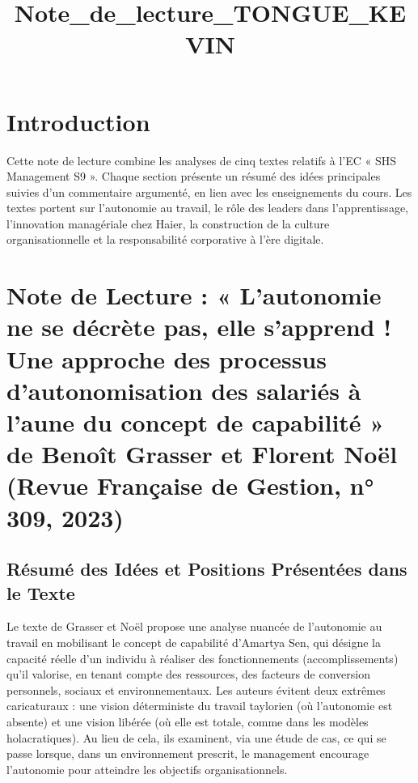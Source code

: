 \documentclass{rapportECL}
\title{Note_de_lecture_TONGUE_KEVIN} %
\begin{document}
\fairemarges
\fairepagedegarde
\tabledematieres

\section{Introduction}
Cette note de lecture combine les analyses de cinq textes relatifs à l'EC « SHS Management S9 ». Chaque section présente un résumé des idées principales suivies d'un commentaire argumenté, en lien avec les enseignements du cours. Les textes portent sur l'autonomie au travail, le rôle des leaders dans l'apprentissage, l'innovation managériale chez Haier, la construction de la culture organisationnelle et la responsabilité corporative à l'ère digitale.

\section{Note de Lecture : « L’autonomie ne se décrète pas, elle s’apprend ! Une approche des processus d’autonomisation des salariés à l’aune du concept de capabilité » de Benoît Grasser et Florent Noël (Revue Française de Gestion, n° 309, 2023)}

\subsection{Résumé des Idées et Positions Présentées dans le Texte}
Le texte de Grasser et Noël propose une analyse nuancée de l’autonomie au travail en mobilisant le concept de capabilité d’Amartya Sen, qui désigne la capacité réelle d’un individu à réaliser des fonctionnements (accomplissements) qu’il valorise, en tenant compte des ressources, des facteurs de conversion personnels, sociaux et environnementaux. Les auteurs évitent deux extrêmes caricaturaux : une vision déterministe du travail taylorien (où l’autonomie est absente) et une vision libérée (où elle est totale, comme dans les modèles holacratiques). Au lieu de cela, ils examinent, via une étude de cas, ce qui se passe lorsque, dans un environnement prescrit, le management encourage l’autonomie pour atteindre les objectifs organisationnels.
\end{document}

